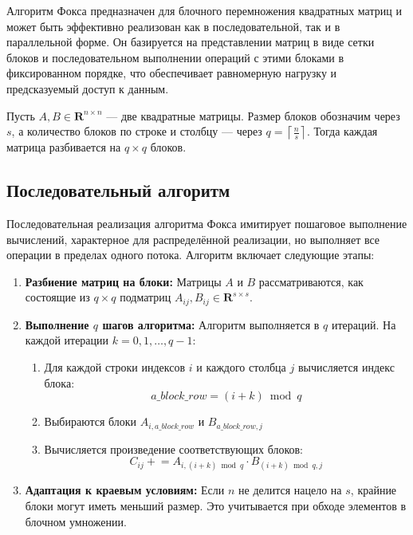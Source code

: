 \documentclass[12pt,a4paper]{extarticle}
\begin{document}
Алгоритм Фокса предназначен для блочного перемножения квадратных матриц и может быть эффективно реализован как в последовательной, так и в параллельной форме. Он базируется на представлении матриц в виде сетки блоков и последовательном выполнении операций с этими блоками в фиксированном порядке, что обеспечивает равномерную нагрузку и предсказуемый доступ к данным.

Пусть \( A, B \in \mathbf{R}^{n \times n} \) — две квадратные матрицы. Размер блоков обозначим через \( s \), а количество блоков по строке и столбцу — через \( q = \left\lceil \frac{n}{s} \right\rceil \). Тогда каждая матрица разбивается на \( q \times q \) блоков.

\subsection{Последовательный алгоритм}

Последовательная реализация алгоритма Фокса имитирует пошаговое выполнение вычислений, характерное для распределённой реализации, но выполняет все операции в пределах одного потока. Алгоритм включает следующие этапы:

\begin{enumerate}
	\item \textbf{Разбиение матриц на блоки:}  
	Матрицы \( A \) и \( B \) рассматриваются, как состоящие из \( q \times q \) подматриц \( A_{ij}, B_{ij} \in \mathbf{R}^{s \times s} \).
	
	\item \textbf{Выполнение $q$ шагов алгоритма:}  
	Алгоритм выполняется в $q$ итераций. На каждой итерации $k = 0, 1, \dots, q-1$:
	
	\begin{enumerate}
		\item Для каждой строки индексов \( i \) и каждого столбца \( j \) вычисляется индекс блока:
		\[
		a\_block\_row = (i + k) \bmod q
		\]
		
		\item Выбираются блоки \( A_{i,a\_block\_row} \) и \( B_{a\_block\_row,j} \)
		
		\item Вычисляется произведение соответствующих блоков:
		\[
		C_{ij} \mathrel{+}= A_{i,(i+k)\bmod q} \cdot B_{(i+k)\bmod q,j}
		\]
	\end{enumerate}
	
	\item \textbf{Адаптация к краевым условиям:}  
	Если \( n \) не делится нацело на \( s \), крайние блоки могут иметь меньший размер. Это учитывается при обходе элементов в блочном умножении.
\end{enumerate}
\end{document}
